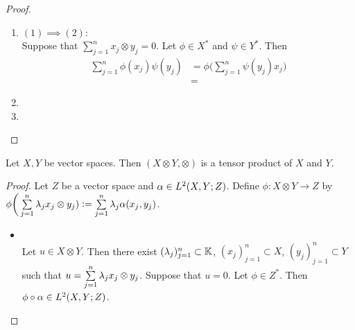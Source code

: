 \documentclass{book}
\begin{document}
	\begin{proof}\
		\begin{enumerate}
			\item $(1) \implies (2):$ \\
			Suppose that $\sum\limits_{j=1}^n x_j \otimes y_j = 0$. Let $\phi \in X^*$ and $\psi \in Y^*$. Then 
			\begin{align*}
				\sum\limits_{j=1}^n  \phi(x_j) \psi(y_j)
				& = \phi \bigg( \sum\limits_{j=1}^n \psi(y_j) x_j \bigg) \\
				& = 
			\end{align*}
			\item 
			\item 
		\end{enumerate}
	\end{proof}
	
	\begin{ex}
		Let $X, Y$ be vector spaces. Then $(X \otimes Y, \otimes)$ is a tensor product of $X$ and $Y$. 
	\end{ex}
	
	\begin{proof}
		Let $Z$ be a vector space and $\alpha \in L^2(X, Y; Z)$. Define $\phi: X \otimes Y \rightarrow Z$ by $\phi \bigg( \sum\limits_{j=1}^n \lambda_j x_j \otimes y_j) \vcentcolon= \sum\limits_{j =1}^n \lambda_j \alpha(x_j, y_j)$.  
		\begin{itemize}
			\item {} \\
			Let $u \in X \otimes Y$. Then there exist $(\lambda_j)_{j=1}^n \subset \mathbb{K}$, $(x_j)_{j=1}^n \subset X$, $(y_j)_{j=1}^n \subset Y$ such that $u = \sum\limits_{j=1}^n \lambda_j x_j \otimes y_j$. Suppose that $u = 0$. Let $\phi \in Z^*$. Then $\phi \circ \alpha \in L^2(X,Y; Z)$.  
		\end{itemize}
	\end{proof}
	
	
	
	
	
	
	
	
	
	
	
	
	
	
	
	
	
	
	
	
	
	
	
	
	
	
	
	
	
	
	
\end{document}
